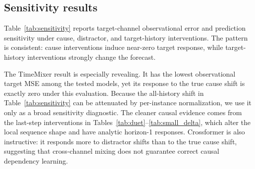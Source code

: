 \documentclass{article}
\begin{document}
\subsection{Sensitivity results}

Table~\ref{tab:sensitivity} reports target-channel observational error and prediction
sensitivity under cause, distractor, and target-history interventions. The pattern is
consistent: cause interventions induce near-zero target response, while target-history
interventions strongly change the forecast.

\begin{table}[t]
\centering
\caption{Sensitivity evaluation on the controlled causal benchmark. Lower MSE/MAE
does not imply stronger response to the true cause. TimeMixer obtains the lowest
target MSE but has zero response to a cause shift.}
\label{tab:sensitivity}
\end{table}

The TimeMixer result is especially revealing. It has the lowest observational target
MSE among the tested models, yet its response to the true cause shift is exactly zero
under this evaluation. Because the all-history shift in Table~\ref{tab:sensitivity}
can be attenuated by per-instance normalization, we use it only as a broad
sensitivity diagnostic. The cleaner causal evidence comes from the last-step
interventions in Tables~\ref{tab:duet}--\ref{tab:small_delta}, which alter the
local sequence shape and have analytic horizon-1 responses. Crossformer is also
instructive: it responds more to distractor shifts than to the true cause shift,
suggesting that cross-channel mixing does not guarantee correct causal dependency
learning.
\end{document}
